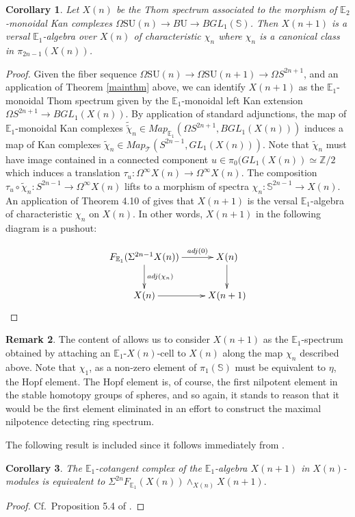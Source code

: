 \documentclass{article}
\theoremstyle{definition}
\newtheorem{rem}{Remark}
\theoremstyle{plain}
\newtheorem{cor}[rem]{Corollary}
\newcommand{\ints}{\mathbb{Z}}
\newcommand{\T}{\mathcal{T}}
\newcommand{\sph}{\mathbb{S}}
\newcommand{\E}{\mathbb{E}}
\newcommand{\BU}{B\mathrm{U}}
\newcommand{\SU}{\mathrm{SU}}
\begin{document}
\begin{cor}
Let $X(n)$ be the Thom spectrum associated to the morphism of $\E_2$-monoidal Kan complexes $\Omega \SU(n)\to \BU\to BGL_1(\sph)$. Then $X(n+1)$ is a versal $\E_1$-algebra over $X(n)$ of characteristic $\chi_n$ where $\chi_{n}$ is a canonical class in $\pi_{2n-1}(X(n))$. 
\end{cor}

\begin{proof}
Given the fiber sequence $\Omega \SU(n)\to\Omega \SU(n+1)\to \Omega S^{2n+1}$, and an application of Theorem \ref{mainthm} above, we can identify $X(n+1)$ as the $\E_1$-monoidal Thom spectrum given by the $\E_1$-monoidal left Kan extension $\Omega S^{2n+1}\to BGL_1(X(n))$. By application of standard adjunctions, the map of $\E_1$-monoidal Kan complexes $\tilde{\tilde{\chi}}_n\in Map_{\E_1}(\Omega S^{2n+1},BGL_1(X(n)))$ induces a map of Kan complexes $\tilde{\chi}_n\in Map_{\T}(S^{2n-1},GL_1(X(n)))$. Note that $\tilde{\chi}_n$ must have image contained in a connected component $u\in\pi_0(GL_1(X(n))\simeq\ints/2$ which induces a translation $\tau_u\colon\Omega^\infty X(n)\to\Omega^\infty X(n)$. The composition $\tau_u\circ\tilde{\chi}_n\colon S^{2n-1}\to \Omega^\infty X(n)$ lifts to a morphism of spectra ${\chi}_n\colon\sph^{2n-1}\to X(n)$. An application of Theorem 4.10 of \cite{acb} gives that $X(n+1)$ is the versal $\E_1$-algebra of characteristic ${\chi}_n$ on $X(n)$. In other words, $X(n+1)$ in the following diagram is a pushout:

$$\xymatrix{
F_{\E_1}(\Sigma^{2n-1}X(n))\ar[r]^-{adj(0)}\ar[d]^-{adj({\chi}_n)}&X(n)\ar[d]\\
X(n)\ar[r]&X(n+1)
}$$
\end{proof}

\begin{rem}
The content of \cite{acb} allows us to consider $X(n+1)$ as the $\E_1$-spectrum obtained by attaching an $\E_1$-$X(n)$-cell to $X(n)$ along the map ${\chi}_n$ described above. Note that ${\chi}_1$, as a non-zero element of $\pi_1(\sph)$ must be equivalent to $\eta$, the Hopf element. The Hopf element is, of course, the first nilpotent element in the stable homotopy groups of spheres, and so again, it stands to reason that it would be the first element eliminated in an effort to construct the maximal nilpotence detecting ring spectrum. 
\end{rem} 

The following result is included since it follows immediately from \cite{acb}.

\begin{cor}
The $\E_1$-cotangent complex of the $\E_1$-algebra $X(n+1)$ in $X(n)$-modules is equivalent to $\Sigma^{2n}F_{\E_1}(X(n))\wedge_{X(n)}X(n+1).$
\end{cor}

\begin{proof}
Cf.~Proposition 5.4 of \cite{acb}. 
\end{proof}



\printbibliography
\end{document}
